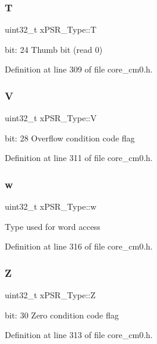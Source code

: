 \subsubsection{\texorpdfstring{T}{T}}
{\footnotesize\ttfamily uint32\+\_\+t x\+P\+S\+R\+\_\+\+Type\+::T}

bit\+: 24 Thumb bit (read 0) 

Definition at line 309 of file core\+\_\+cm0.\+h.

\mbox{\label{unionx_p_s_r___type_af14df16ea0690070c45b95f2116b7a0a}} 
\subsubsection{\texorpdfstring{V}{V}}
{\footnotesize\ttfamily uint32\+\_\+t x\+P\+S\+R\+\_\+\+Type\+::V}

bit\+: 28 Overflow condition code flag 

Definition at line 311 of file core\+\_\+cm0.\+h.

\mbox{\label{unionx_p_s_r___type_a1a47176768f45f79076c4f5b1b534bc2}} 
\subsubsection{\texorpdfstring{w}{w}}
{\footnotesize\ttfamily uint32\+\_\+t x\+P\+S\+R\+\_\+\+Type\+::w}

Type used for word access 

Definition at line 316 of file core\+\_\+cm0.\+h.

\mbox{\label{unionx_p_s_r___type_a1e5d9801013d5146f2e02d9b7b3da562}} 
\subsubsection{\texorpdfstring{Z}{Z}}
{\footnotesize\ttfamily uint32\+\_\+t x\+P\+S\+R\+\_\+\+Type\+::Z}

bit\+: 30 Zero condition code flag 

Definition at line 313 of file core\+\_\+cm0.\+h.



